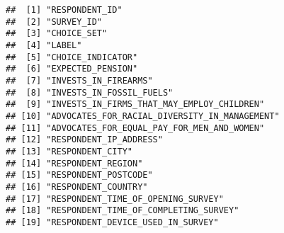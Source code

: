 \documentclass[
]{article}
\begin{document}
\begin{verbatim}
##  [1] "RESPONDENT_ID"                                                                                                               
##  [2] "SURVEY_ID"                                                                                                                   
##  [3] "CHOICE_SET"                                                                                                                  
##  [4] "LABEL"                                                                                                                       
##  [5] "CHOICE_INDICATOR"                                                                                                            
##  [6] "EXPECTED_PENSION"                                                                                                            
##  [7] "INVESTS_IN_FIREARMS"                                                                                                         
##  [8] "INVESTS_IN_FOSSIL_FUELS"                                                                                                     
##  [9] "INVESTS_IN_FIRMS_THAT_MAY_EMPLOY_CHILDREN"                                                                                   
## [10] "ADVOCATES_FOR_RACIAL_DIVERSITY_IN_MANAGEMENT"                                                                                
## [11] "ADVOCATES_FOR_EQUAL_PAY_FOR_MEN_AND_WOMEN"                                                                                   
## [12] "RESPONDENT_IP_ADDRESS"                                                                                                       
## [13] "RESPONDENT_CITY"                                                                                                             
## [14] "RESPONDENT_REGION"                                                                                                           
## [15] "RESPONDENT_POSTCODE"                                                                                                         
## [16] "RESPONDENT_COUNTRY"                                                                                                          
## [17] "RESPONDENT_TIME_OF_OPENING_SURVEY"                                                                                           
## [18] "RESPONDENT_TIME_OF_COMPLETING_SURVEY"                                                                                        
## [19] "RESPONDENT_DEVICE_USED_IN_SURVEY"                                                                                            

\end{verbatim}
\end{document}
